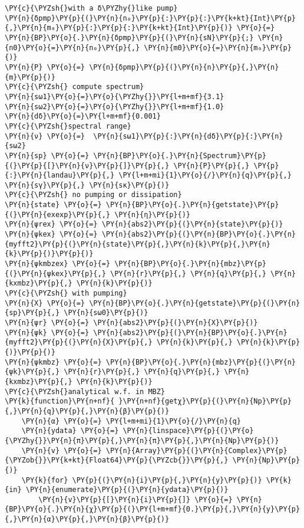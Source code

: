\begin{Verbatim}[commandchars=\\\{\}]
\PY{c}{\PYZsh{}with a δ\PYZhy{}like pump}
\PY{n}{δpmp}\PY{p}{(}\PY{n}{n₀}\PY{p}{:}\PY{p}{:}\PY{k+kt}{Int}\PY{p}{,}\PY{n}{m₀}\PY{p}{:}\PY{p}{:}\PY{k+kt}{Int}\PY{p}{)} \PY{o}{=} \PY{n}{BP}\PY{o}{.}\PY{n}{δpmp}\PY{p}{(}\PY{n}{sN}\PY{p}{;} \PY{n}{n0}\PY{o}{=}\PY{n}{n₀}\PY{p}{,} \PY{n}{m0}\PY{o}{=}\PY{n}{m₀}\PY{p}{)}
\PY{n}{P} \PY{o}{=} \PY{n}{δpmp}\PY{p}{(}\PY{n}{n}\PY{p}{,}\PY{n}{m}\PY{p}{)}
\PY{c}{\PYZsh{} compute spectrum}
\PY{n}{sω1}\PY{o}{=}\PY{o}{\PYZhy{}}\PY{l+m+mf}{3.1}
\PY{n}{sω2}\PY{o}{=}\PY{o}{\PYZhy{}}\PY{l+m+mf}{1.0}
\PY{n}{dδ}\PY{o}{=}\PY{l+m+mf}{0.001}
\PY{c}{\PYZsh{}spectral range}
\PY{n}{ν} \PY{o}{=}  \PY{n}{sω1}\PY{p}{:}\PY{n}{dδ}\PY{p}{:}\PY{n}{sω2}
\PY{n}{sp} \PY{o}{=} \PY{n}{BP}\PY{o}{.}\PY{n}{Spectrum}\PY{p}{(}\PY{p}{[}\PY{n}{ν}\PY{p}{]}\PY{p}{,} \PY{n}{P}\PY{p}{,} \PY{p}{:}\PY{n}{landau}\PY{p}{,} \PY{l+m+mi}{1}\PY{o}{/}\PY{n}{q}\PY{p}{,} \PY{n}{sγ}\PY{p}{,} \PY{n}{sκ}\PY{p}{)}
\PY{c}{\PYZsh{} no pumping or dissipation}
\PY{n}{state} \PY{o}{=} \PY{n}{BP}\PY{o}{.}\PY{n}{getstate}\PY{p}{(}\PY{n}{exexp}\PY{p}{,} \PY{n}{η}\PY{p}{)}
\PY{n}{ψrex} \PY{o}{=} \PY{n}{abs2}\PY{p}{(}\PY{n}{state}\PY{p}{)}
\PY{n}{ψkex} \PY{o}{=} \PY{n}{abs2}\PY{p}{(}\PY{n}{BP}\PY{o}{.}\PY{n}{myfft2}\PY{p}{(}\PY{n}{state}\PY{p}{,}\PY{n}{k}\PY{p}{,}\PY{n}{k}\PY{p}{)}\PY{p}{)}
\PY{n}{ψkmbzex} \PY{o}{=} \PY{n}{BP}\PY{o}{.}\PY{n}{mbz}\PY{p}{(}\PY{n}{ψkex}\PY{p}{,} \PY{n}{r}\PY{p}{,} \PY{n}{q}\PY{p}{,} \PY{n}{kxmbz}\PY{p}{,} \PY{n}{k}\PY{p}{)}
\PY{c}{\PYZsh{} with pumping}
\PY{n}{X} \PY{o}{=} \PY{n}{BP}\PY{o}{.}\PY{n}{getstate}\PY{p}{(}\PY{n}{sp}\PY{p}{,} \PY{n}{sω0}\PY{p}{)}
\PY{n}{ψr} \PY{o}{=} \PY{n}{abs2}\PY{p}{(}\PY{n}{X}\PY{p}{)}
\PY{n}{ψk} \PY{o}{=} \PY{n}{abs2}\PY{p}{(}\PY{n}{BP}\PY{o}{.}\PY{n}{myfft2}\PY{p}{(}\PY{n}{X}\PY{p}{,} \PY{n}{k}\PY{p}{,} \PY{n}{k}\PY{p}{)}\PY{p}{)}
\PY{n}{ψkmbz} \PY{o}{=} \PY{n}{BP}\PY{o}{.}\PY{n}{mbz}\PY{p}{(}\PY{n}{ψk}\PY{p}{,} \PY{n}{r}\PY{p}{,} \PY{n}{q}\PY{p}{,} \PY{n}{kxmbz}\PY{p}{,} \PY{n}{k}\PY{p}{)}
\PY{c}{\PYZsh{}analytical w.f. in MBZ}
\PY{k}{function}\PY{n+nf}{ }\PY{n+nf}{getχ}\PY{p}{(}\PY{n}{Np}\PY{p}{,}\PY{n}{q}\PY{p}{,}\PY{n}{β}\PY{p}{)}
    \PY{n}{α} \PY{o}{=} \PY{l+m+mi}{1}\PY{o}{/}\PY{n}{q}
    \PY{n}{ydata} \PY{o}{=} \PY{n}{linspace}\PY{p}{(}\PY{o}{\PYZhy{}}\PY{n}{π}\PY{p}{,}\PY{n}{π}\PY{p}{,}\PY{n}{Np}\PY{p}{)}
    \PY{n}{v} \PY{o}{=} \PY{n}{Array}\PY{p}{(}\PY{n}{Complex}\PY{p}{\PYZob{}}\PY{k+kt}{Float64}\PY{p}{\PYZcb{}}\PY{p}{,} \PY{n}{Np}\PY{p}{)}
    \PY{k}{for} \PY{p}{(}\PY{n}{i}\PY{p}{,}\PY{n}{y}\PY{p}{)} \PY{k}{in} \PY{n}{enumerate}\PY{p}{(}\PY{n}{ydata}\PY{p}{)}
        \PY{n}{v}\PY{p}{[}\PY{n}{i}\PY{p}{]} \PY{o}{=} \PY{n}{BP}\PY{o}{.}\PY{n}{χ}\PY{p}{(}\PY{l+m+mf}{0.}\PY{p}{,}\PY{n}{y}\PY{p}{,}\PY{n}{α}\PY{p}{,}\PY{n}{β}\PY{p}{)}

\end{Verbatim}
